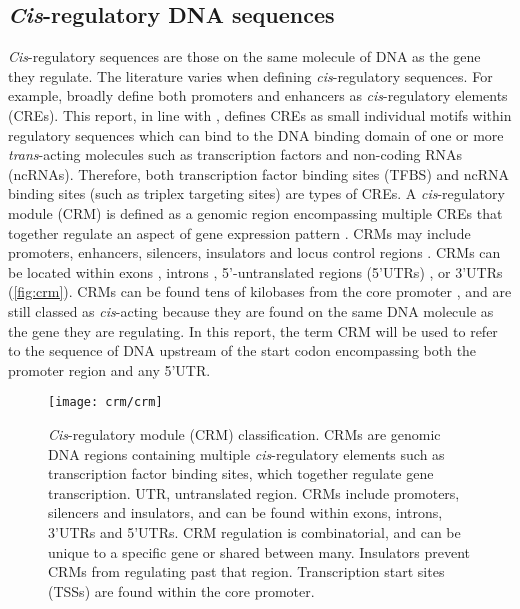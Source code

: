 \documentclass[../main.tex]{subfiles}
\begin{document}
\subsection{\texorpdfstring{\textit{Cis}-regulatory DNA sequences}{Cis\hyp{}regulatory DNA sequences}}\label{chapter1:cis-regulatory-dna-sequences}
\textit{Cis}\hyp{}regulatory sequences are those on the same molecule of DNA as the gene they regulate.
The literature varies when defining \textit{cis}\hyp{}regulatory sequences.
For example, \textcite*{wittkoppCisregulatoryElementsMolecular2012} broadly define both promoters and enhancers as \textit{cis}\hyp{}regulatory elements (CREs).
This report, in line with \textcite*{swinnenLessonsDomesticationTargeting2016}, defines CREs as small individual motifs within regulatory sequences which can bind to the DNA binding domain of one or more \textit{trans}\hyp{}acting molecules such as transcription factors and non\hyp{}coding RNAs (ncRNAs).
Therefore, both transcription factor binding sites (TFBS) and ncRNA binding sites (such as triplex targeting sites) are types of CREs.
A \textit{cis}\hyp{}regulatory module (CRM) is defined as a genomic region encompassing multiple CREs that together regulate an aspect of gene expression pattern \autocite{guoNewAlgorithmIdentifying2017}.
CRMs may include promoters, enhancers, silencers, insulators and locus control regions \autocite{jeziorskaSystemsBiologyApproach2009}.
CRMs can be located within exons \autocite{tumpelRegulatoryModuleEmbedded2008}, introns \autocite{ostrovskyIdentificationStrongIntron2018}, 5’\hyp{}untranslated regions (5’UTRs) \autocite{bolleSegmentsEncodingUntranslated1994,henrySharedCisregulatoryModule2018}, or 3’UTRs \autocite{palmerEnhancerControlsSnail2007,yochumGenomewideScreenBetacatenin2008} (\autoref{fig:crm}).
CRMs can be found tens of kilobases from the core promoter \autocite{bien-willnerSOX9cre1CisactingRegulatory2007,okaGenomewideMappingTranscriptional2017}, and are still classed as \textit{cis}\hyp{}acting because they are found on the same DNA molecule as the gene they are regulating.
In this report, the term CRM will be used to refer to the sequence of DNA upstream of the start codon encompassing both the promoter region and any 5’UTR.

\begin{figure}[!hbt]
	\begin{center}
		\capstart{}
		\texttt{[image: crm/crm]}
		\caption{
			\textit{Cis}\hyp{}regulatory module (CRM) classification.
			CRMs are genomic DNA regions containing multiple \textit{cis}\hyp{}regulatory elements such as transcription factor binding sites, which together regulate gene transcription.
			UTR, untranslated region.
			CRMs include promoters, silencers and insulators, and can be found within exons, introns, 3'UTRs and 5'UTRs.
			CRM regulation is combinatorial, and can be unique to a specific gene or shared between many.
			Insulators prevent CRMs from regulating past that region.
			Transcription start sites (TSSs) are found within the core promoter.\label{fig:crm}
		}
	\end{center}
\end{figure}
\end{document}
